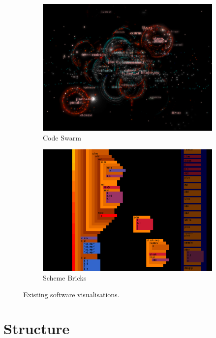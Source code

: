 \begin{figure}
\begin{subfigure}{.5\textwidth}
  \includegraphics[width=.95\linewidth]{../images/code-visualisations/code-swarm.png}
  \caption{Code Swarm}
  \label{fig:code-swarm}
\end{subfigure}%
\begin{subfigure}{.5\textwidth}
  \centering
  \includegraphics[width=.95\linewidth]{../images/code-visualisations/scheme-bricks.png}
  \caption{Scheme Bricks}
  \label{fig:scheme-bricks}
\end{subfigure}

\caption{Existing software visualisations.}
\label{fig:code-visualisations}
\end{figure}

\section{Structure}

